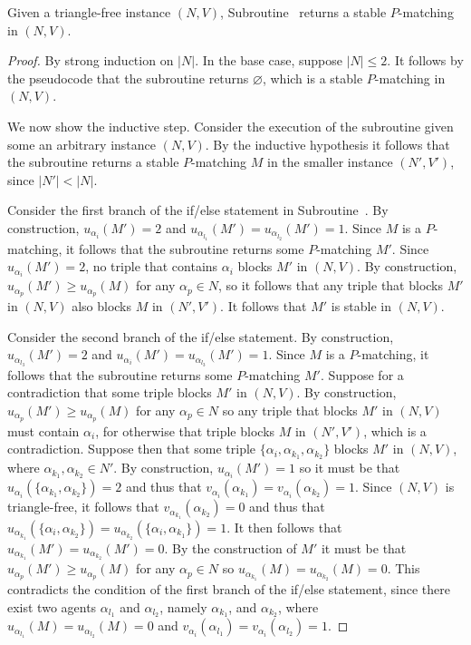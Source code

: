 \begin{lem}
\label{lem:threed_sr_as_symmetric_binary_algfindsstablepmatching_notimecomplex}
Given a triangle-free instance $(N, V)$, Subroutine~ returns a stable $P$\nobreakdash-matching in $(N, V)$.
\end{lem}
\begin{proof}
By strong induction on $|N|$. In the base case, suppose $|N| \leq 2$. It follows by the pseudocode that the subroutine returns $\varnothing$, which is a stable $P$\nobreakdash-matching in $(N, V)$.

We now show the inductive step. Consider the execution of the subroutine given some an arbitrary instance $(N, V)$. By the inductive hypothesis it follows that the subroutine returns a stable $P$\nobreakdash-matching $M$ in the smaller instance $(N', V')$, since $|N'| < |N|$.

Consider the first branch of the if/else statement in Subroutine~. By construction, $u_{\alpha_{i}}(M') = 2$ and $u_{\alpha_{l_1}}(M')=u_{\alpha_{l_2}}(M')=1$. Since $M$ is a $P$\nobreakdash-matching, it follows that the subroutine returns some $P$\nobreakdash-matching $M'$. Since $u_{\alpha_i}(M')=2$, no triple that contains $\alpha_i$ blocks $M'$ in $(N, V)$. By construction, $u_{\alpha_p}(M')\geq u_{\alpha_p}(M)$ for any $\alpha_p \in N$, so it follows that any triple that blocks $M'$ in $(N, V)$ also blocks $M$ in $(N', V')$. It follows that $M'$ is stable in $(N, V)$.

Consider the second branch of the if/else statement. By construction, $u_{\alpha_{l_3}}(M')=2$ and $u_{\alpha_{i}}(M')=u_{\alpha_{l_3}}(M')=1$. Since $M$ is a $P$\nobreakdash-matching, it follows that the subroutine returns some $P$\nobreakdash-matching $M'$. Suppose for a contradiction that some triple blocks $M'$ in $(N, V)$. By construction, $u_{\alpha_p}(M')\geq u_{\alpha_p}(M)$ for any $\alpha_p\in N$ so any triple that blocks $M'$ in $(N, V)$ must contain $\alpha_i$, for otherwise that triple blocks $M$ in $(N', V')$, which is a contradiction. Suppose then that some triple $\{ \alpha_i, \alpha_{k_1}, \alpha_{k_2} \}$ blocks $M'$ in $(N, V)$, where $\alpha_{k_1}, \alpha_{k_2} \in N'$. By construction, $u_{\alpha_i}(M')=1$ so it must be that $u_{\alpha_i}(\{ \alpha_{k_1}, \alpha_{k_2} \})=2$ and thus that $v_{\alpha_i}(\alpha_{k_1})=v_{\alpha_i}(\alpha_{k_2})=1$. Since $(N, V)$ is triangle-free, it follows that $v_{\alpha_{k_1}}(\alpha_{k_2}) = 0$ and thus that $u_{\alpha_{k_1}}(\{ \alpha_{i}, \alpha_{k_2} \})=u_{\alpha_{k_2}}(\{ \alpha_{i}, \alpha_{k_1} \})=1$. It then follows that $u_{\alpha_{k_1}}(M')=u_{\alpha_{k_2}}(M')=0$. By the construction of $M'$ it must be that $u_{\alpha_p}(M')\geq u_{\alpha_p}(M)$ for any $\alpha_p\in N$ so $u_{\alpha_{k_1}}(M)=u_{\alpha_{k_2}}(M)=0$. This contradicts the condition of the first branch of the if/else statement, since there exist two agents $\alpha_{l_1}$ and $\alpha_{l_2}$, namely $\alpha_{k_1}$, and $\alpha_{k_2}$, where $u_{\alpha_{l_1}}(M)=u_{\alpha_{l_2}}(M)=0$ and $v_{\alpha_i}(\alpha_{l_1})=v_{\alpha_i}(\alpha_{l_2})=1$.


\end{proof}
